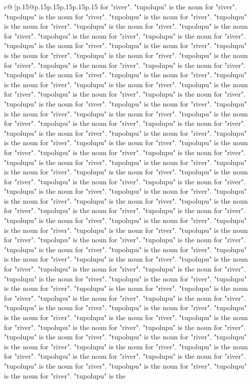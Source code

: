 \documentclass{article}
\begin{document}
{\begin{supertabular}{c@{$\;$}|p{.15\linewidth}@{}p{.15\linewidth}p{.15\linewidth}p{.15\linewidth}p{.15\linewidth}p{.15\linewidth}}
{{{for "river". "tupolupu" is the noun for "river". "tupolupu" is the noun for "river". "tupolupu" is the noun for "river". "tupolupu" is the noun for "river". "tupolupu" is the noun for "river". "tupolupu" is the noun for "river". "tupolupu" is the noun for "river". "tupolupu" is the noun for "river". "tupolupu" is the noun for "river". "tupolupu" is the noun for "river". "tupolupu" is the noun for "river". "tupolupu" is the noun for "river". "tupolupu" is the noun for "river". "tupolupu" is the noun for "river". "tupolupu" is the noun for "river". "tupolupu" is the noun for "river". "tupolupu" is the noun for "river". "tupolupu" is the noun for "river". "tupolupu" is the noun for "river". "tupolupu" is the noun for "river". "tupolupu" is the noun for "river". "tupolupu" is the noun for "river". "tupolupu" is the noun for "river". "tupolupu" is the noun for "river". "tupolupu" is the noun for "river". "tupolupu" is the noun for "river". "tupolupu" is the noun for "river". "tupolupu" is the noun for "river". "tupolupu" is the noun for "river". "tupolupu" is the noun for "river". "tupolupu" is the noun for "river". "tupolupu" is the noun for "river". "tupolupu" is the noun for "river". "tupolupu" is the noun for "river". "tupolupu" is the noun for "river". "tupolupu" is the noun for "river". "tupolupu" is the noun for "river". "tupolupu" is the noun for "river". "tupolupu" is the noun for "river". "tupolupu" is the noun for "river". "tupolupu" is the noun for "river". "tupolupu" is the noun for "river". "tupolupu" is the noun for "river". "tupolupu" is the noun for "river". "tupolupu" is the noun for "river". "tupolupu" is the noun for "river". "tupolupu" is the noun for "river". "tupolupu" is the noun for "river". "tupolupu" is the noun for "river". "tupolupu" is the noun for "river". "tupolupu" is the noun for "river". "tupolupu" is the noun for "river". "tupolupu" is the noun for "river". "tupolupu" is the noun for "river". "tupolupu" is the noun for "river". "tupolupu" is the noun for "river". "tupolupu" is the noun for "river". "tupolupu" is the noun for "river". "tupolupu" is the noun for "river". "tupolupu" is the noun for "river". "tupolupu" is the noun for "river". "tupolupu" is the noun for "river". "tupolupu" is the noun for "river". "tupolupu" is the noun for "river". "tupolupu" is the noun for "river". "tupolupu" is the noun for "river". "tupolupu" is the noun for "river". "tupolupu" is the noun for "river". "tupolupu" is the noun for "river". "tupolupu" is the noun for "river". "tupolupu" is the noun for "river". "tupolupu" is the noun for "river". "tupolupu" is the noun for "river". "tupolupu" is the noun for "river". "tupolupu" is the noun for "river". "tupolupu" is the noun for "river". "tupolupu" is the noun for "river". "tupolupu" is the noun for "river". "tupolupu" is the noun for "river". "tupolupu" is the noun for "river". "tupolupu" is the noun for "river". "tupolupu" is the noun for "river". "tupolupu" is the noun for "river". "tupolupu" is the noun for "river". "tupolupu" is the noun for "river". "tupolupu" is the noun for "river". "tupolupu" is the noun for "river". "tupolupu" is the noun for "river". "tupolupu" is the }}}
\end{supertabular}}
\end{document}
